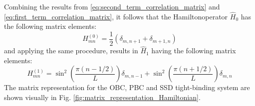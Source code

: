 \documentclass[11pt, a4paper, oneside]{book}
\theoremstyle{definition} %
\begin{document}
	 Combining the results from \ref{eq:second_term_correlation_matrix} and \ref{eq:first_term_correlation_matrix}, it follows that the Hamiltonoperator $\hat{H}_0$ has the following matrix elements:
	 \begin{equation}
	 	H^{(0)}_{mn} = \frac{1}{2} \left(\delta_{m, n+1} + \delta_{m+1, n}\right)
	 \end{equation}
	 and applying the same procedure, results in $\hat{H}_1$ having the following matrix elements:
	 \begin{equation}
	 	H_{mn}^{(1)} = \sin^2\left(\frac{\pi(n-1/2)}{L}\right) \delta_{m,n-1} + \sin^2\left(\frac{\pi(n+1/2)}{L}\right) \delta_{m,n}
	 \end{equation}
	The matrix representation for the OBC, PBC and SSD tight-binding system are shown visually in Fig. \ref{fig:matrix_representation_Hamiltonian}.
\end{document}
